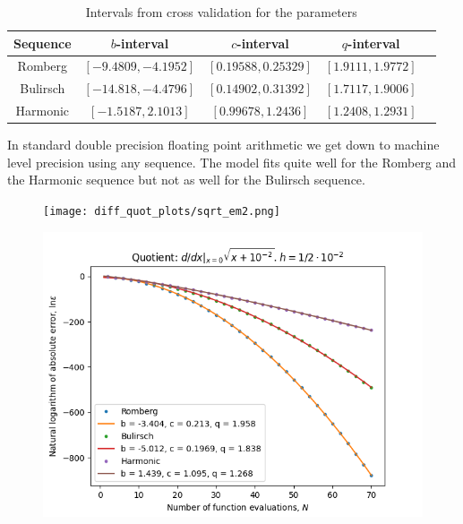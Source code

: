 \begin{table}[H]
    \centering
    \begin{tabular}{c|c||c|c|c}
Sequence & \(b\)-interval & \(c\)-interval & \(q\)-interval\\\hline\hline
Romberg &\([-9.4809, -4.1952]\) & \([0.19588, 0.25329]\) & \([1.9111, 1.9772]\)\\
Bulirsch & \([-14.818, -4.4796]\) & \([0.14902, 0.31392]\) & \([1.7117, 1.9006]\)\\
Harmonic & \([-1.5187, 2.1013]\) & \([0.99678, 1.2436]\) & \([1.2408, 1.2931]\)\\
    \end{tabular}
    \caption{Intervals from cross validation for the parameters}
    \label{tab:my_label}
\end{table}

In standard double precision floating point arithmetic we get down to machine level precision using any sequence. The model fits quite well for the Romberg and the Harmonic sequence but not as well for the Bulirsch sequence.

\begin{figure}[H]
\centering
\begin{minipage}{0.45\textwidth}
\centering
\texttt{[image: diff\_quot\_plots/sqrt\_em2.png]}
\end{minipage}
\begin{minipage}{0.45\textwidth}
\centering
\includegraphics[scale=0.45]{diff_quot_plots/sqrt_em2_hp_trend.png}
\end{minipage}
\end{figure}

